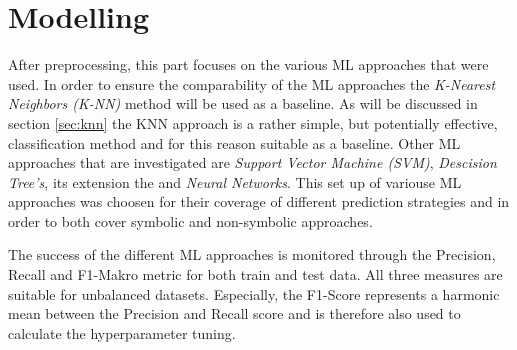 \chapter{Modelling}\label{sec:data_mining}





After preprocessing, this part focuses on the various ML approaches that were used. In order to ensure the comparability of the ML approaches the \textit{K-Nearest Neighbors (K-NN)} method will be used as a baseline. As will be discussed in section \ref{sec:knn} the KNN approach is a rather simple, but potentially effective, classification method and for this reason suitable as a baseline. Other ML approaches that are investigated are \textit{Support Vector Machine (SVM)}, \textit{Descision Tree's}, its extension the  and \textit{Neural Networks}. This set up of variouse ML approaches was choosen for their coverage of different prediction strategies and in order to both cover symbolic and non-symbolic approaches.

The success of the different ML approaches is monitored through the Precision, Recall and F1-Makro metric for both train and test data. All three measures are suitable for unbalanced datasets. \citep{Brownlee2020} Especially, the F1-Score represents a harmonic mean between the Precision and Recall score and is therefore also used to calculate the hyperparameter tuning.\citep{Peltarion2021}


